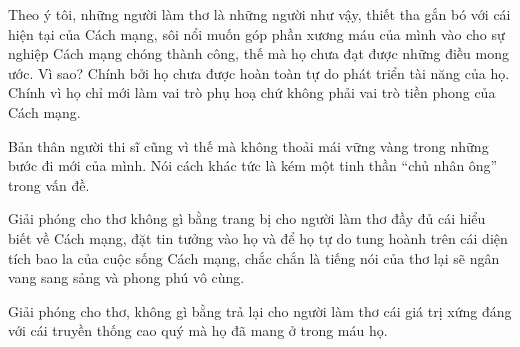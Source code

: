 \documentclass[../main.tex]{subfiles}
\begin{document}
\begin{multicols}{2}
Theo ý tôi, những người làm thơ là những người như vậy, thiết tha gắn bó với cái hiện tại của Cách mạng, sôi nổi muốn góp phần xương máu của mình vào cho sự nghiệp Cách mạng chóng thành công, thế mà họ chưa đạt được những điều mong ước. Vì sao? Chính bởi họ chưa được hoàn toàn tự do phát triển tài năng của họ. Chính vì họ chỉ mới làm vai trò phụ hoạ chứ không phải vai trò tiền phong của Cách mạng. 
 
Bản thân người thi sĩ cũng vì thế mà không thoải mái vững vàng trong những bước đi mới của mình. Nói cách khác tức là kém một tinh thần “chủ nhân ông” trong vấn đề.  
 
Giải phóng cho thơ không gì bằng trang bị cho người làm thơ đầy đủ cái hiểu biết về Cách mạng, đặt tin tưởng vào họ và để họ tự do tung hoành trên cái diện tích bao la của cuộc sống Cách mạng, chắc chắn là tiếng nói của thơ lại sẽ ngân vang sang sảng và phong phú vô cùng. 
 
Giải phóng cho thơ, không gì bằng trả lại cho người làm thơ cái giá trị xứng đáng với cái truyền thống cao quý mà họ đã mang ở trong máu họ.  
\end{multicols}
\end{document}

